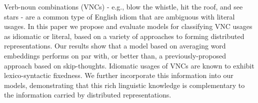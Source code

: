 Verb-noun combinations (VNCs) - e.g., blow the whistle, hit the roof, and see stars - are a common type of English idiom that are ambiguous with literal usages. In this paper we propose and evaluate models for classifying VNC usages as idiomatic or literal, based on a variety of approaches to forming distributed representations. Our results show that a model based on averaging word embeddings performs on par with, or better than, a previously-proposed approach based on skip-thoughts. Idiomatic usages of VNCs are known to exhibit lexico-syntactic fixedness. We further incorporate this information into our models, demonstrating that this rich linguistic knowledge is complementary to the information carried by distributed representations.

